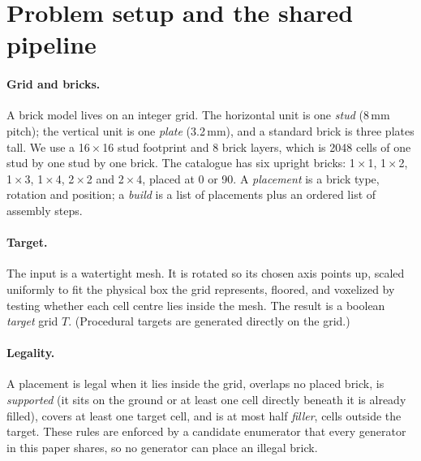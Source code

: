 \section{Problem setup and the shared pipeline}
\label{sec:setup}

\paragraph{Grid and bricks.} A brick model lives on an integer grid. The horizontal unit is one \emph{stud}
(8\,mm pitch); the vertical unit is one \emph{plate} (3.2\,mm), and a standard brick is three plates tall. We use a
16\,$\times$\,16 stud footprint and 8 brick layers, which is 2048 cells of one stud by one stud by one brick. The
catalogue has six upright bricks: 1\,$\times$\,1, 1\,$\times$\,2, 1\,$\times$\,3, 1\,$\times$\,4, 2\,$\times$\,2 and
2\,$\times$\,4, placed at 0\textdegree{} or 90\textdegree. A \emph{placement} is a brick type, rotation and
position; a \emph{build} is a list of placements plus an ordered list of assembly steps.

\paragraph{Target.} The input is a watertight mesh. It is rotated so its chosen axis points up, scaled uniformly to fit
the physical box the grid represents, floored, and voxelized by testing whether each cell centre lies inside the
mesh. The result is a boolean \emph{target} grid $T$. (Procedural targets are generated directly on the grid.)

\paragraph{Legality.} A placement is legal when it lies inside the grid, overlaps no placed brick, is \emph{supported}
(it sits on the ground or at least one cell directly beneath it is already filled), covers at least one target cell,
and is at most half \emph{filler}, cells outside the target. These rules are enforced by a candidate enumerator that
every generator in this paper shares, so no generator can place an illegal brick.

